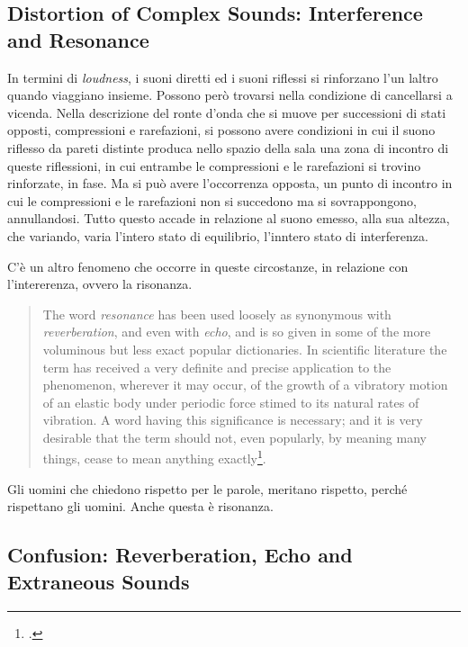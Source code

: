 \subsection{Distortion of Complex Sounds: Interference and Resonance}

In termini di \emph{loudness}, i suoni diretti ed i suoni riflessi si rinforzano
l'un laltro quando viaggiano insieme. Possono però trovarsi nella condizione di
cancellarsi a vicenda. Nella descrizione del ronte d'onda che si muove per
successioni di stati opposti, compressioni e rarefazioni, si possono avere
condizioni in cui il suono riflesso da pareti distinte produca nello spazio della
sala una zona di incontro di queste riflessioni, in cui entrambe le compressioni e
le rarefazioni si trovino rinforzate, in fase. Ma si può avere l'occorrenza opposta,
un punto di incontro in cui le compressioni e le rarefazioni non si succedono ma
si sovrappongono, annullandosi. Tutto questo accade in relazione al suono emesso,
alla sua altezza, che variando, varia l'intero stato di equilibrio, l'inntero stato
di interferenza.

C'è un altro fenomeno che occorre in queste circostanze, in relazione con
l'intererenza, ovvero la risonanza.

\begin{quote}
  The word \emph{resonance} has been used loosely as synonymous with
  \emph{reverberation}, and even with \emph{echo}, and is so given in some of
  the more voluminous but less exact popular dictionaries. In scientific
  literature the term has received a very definite and precise application to
  the phenomenon, wherever it may occur, of the growth of a vibratory motion of
  an elastic body under periodic force stimed to its natural rates of vibration.
  A word having this significance is necessary; and it is very desirable that
  the term should not, even popularly, by meaning many things, cease to mean
  anything exactly\footcite{ws:rev}.
\end{quote}

Gli uomini che chiedono rispetto per le parole, meritano rispetto, perché
rispettano gli uomini. Anche questa è risonanza.

\subsection{Confusion: Reverberation, Echo and Extraneous Sounds}

